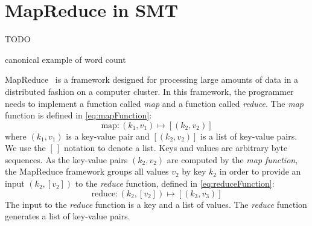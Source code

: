 \section{MapReduce in SMT}
\label{sec:mapReduceInSMT}

TODO

canonical example of word count

MapReduce~\citep{dean-ghemawat:2008:ACM} is a framework designed for processing
large amounts of data in a distributed fashion on a computer cluster. In this
framework, the programmer needs to implement a function called \emph{map} and
a function called \emph{reduce}. The \emph{map} function is defined in
\autoref{eq:mapFunction}:
%
\begin{equation}
  \text{map} : (k_1, v_1) \longmapsto [(k_2, v_2)]
  \label{eq:mapFunction}
\end{equation}
%
where $(k_1, v_1)$ is a key-value pair and $[(k_2, v_2)]$ is a list of
key-value pairs. We use the $[ \, ]$ notation to denote a list. Keys and values are arbitrary byte sequences. As the key-value
pairs $(k_2, v_2)$ are computed by the \emph{map function}, the MapReduce framework groups all values $v_2$ by key $k_2$ in order
to provide an input $(k_2, [v_2])$ to the \emph{reduce} function, defined in
\autoref{eq:reduceFunction}:
%
\begin{equation}
  \text{reduce} : (k_2, [v_2]) \longmapsto [(k_3, v_3)]
  \label{eq:reduceFunction}
\end{equation}
%
The input to the \emph{reduce} function is a key and a list of values. The
\emph{reduce} function generates a list of key-value pairs.
